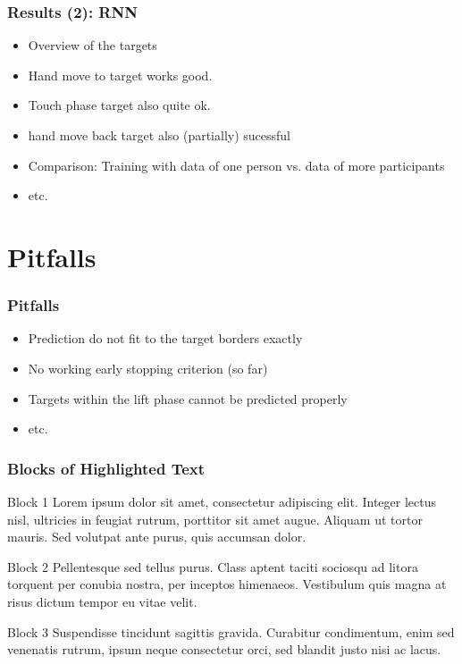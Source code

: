 \documentclass{beamer}
\begin{document}
\begin{frame}
	\frametitle{Results (2): RNN}
	\begin{itemize}
		\item Overview of the targets
		\item Hand move to target works good.
		\item Touch phase target also quite ok.
		\item hand move back target also (partially) sucessful
		\item Comparison: Training with data of one person vs. data of more participants
		\item etc.
	\end{itemize}
\end{frame}

\section{Pitfalls}

\begin{frame}
	\frametitle{Pitfalls}
	\begin{itemize}
		\item Prediction do not fit to the target borders exactly
		\item No working early stopping criterion (so far)
		\item Targets within the lift phase cannot be predicted properly
		\item etc.
	\end{itemize}
\end{frame}


\begin{frame}
\frametitle{Blocks of Highlighted Text}
\begin{block}{Block 1}
Lorem ipsum dolor sit amet, consectetur adipiscing elit. Integer lectus nisl, ultricies in feugiat rutrum, porttitor sit amet augue. Aliquam ut tortor mauris. Sed volutpat ante purus, quis accumsan dolor.
\end{block}

\begin{block}{Block 2}
Pellentesque sed tellus purus. Class aptent taciti sociosqu ad litora torquent per conubia nostra, per inceptos himenaeos. Vestibulum quis magna at risus dictum tempor eu vitae velit.
\end{block}

\begin{block}{Block 3}
Suspendisse tincidunt sagittis gravida. Curabitur condimentum, enim sed venenatis rutrum, ipsum neque consectetur orci, sed blandit justo nisi ac lacus.
\end{block}
\end{frame}
\end{document}
